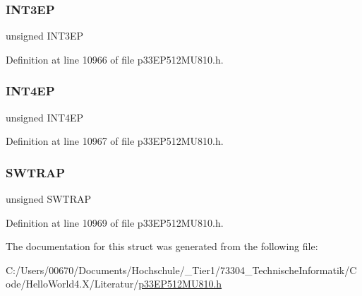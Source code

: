 \subsubsection{\texorpdfstring{I\+N\+T3\+EP}{INT3EP}}
{\footnotesize\ttfamily unsigned I\+N\+T3\+EP}



Definition at line 10966 of file p33\+E\+P512\+M\+U810.\+h.

\mbox{\label{structtag_i_n_t_c_o_n2_b_i_t_s_a21ab2b68eea317962ade11b4e72dd387}} 
\subsubsection{\texorpdfstring{I\+N\+T4\+EP}{INT4EP}}
{\footnotesize\ttfamily unsigned I\+N\+T4\+EP}



Definition at line 10967 of file p33\+E\+P512\+M\+U810.\+h.

\mbox{\label{structtag_i_n_t_c_o_n2_b_i_t_s_a728f320cf11d94553e11df9e9a1dc0db}} 
\subsubsection{\texorpdfstring{S\+W\+T\+R\+AP}{SWTRAP}}
{\footnotesize\ttfamily unsigned S\+W\+T\+R\+AP}



Definition at line 10969 of file p33\+E\+P512\+M\+U810.\+h.



The documentation for this struct was generated from the following file\+:\begin{DoxyCompactItemize}
\item 
C\+:/\+Users/00670/\+Documents/\+Hochschule/\+\_\+\+Tier1/73304\+\_\+\+Technische\+Informatik/\+Code/\+Hello\+World4.\+X/\+Literatur/\hyperlink{p33_e_p512_m_u810_8h}{p33\+E\+P512\+M\+U810.\+h}\end{DoxyCompactItemize}
